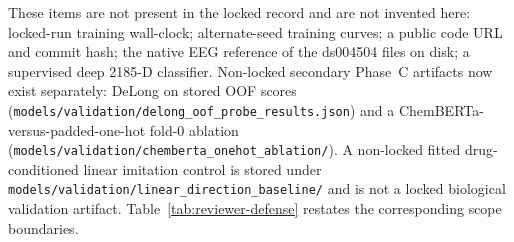 These items are not present in the locked record and are not invented here: locked-run training wall-clock; alternate-seed training curves; a public code URL and commit hash; the native EEG reference of the ds004504 files on disk; a supervised deep 2185-D classifier. Non-locked secondary Phase~C artifacts now exist separately: DeLong on stored OOF scores (\texttt{models/\allowbreak{}validation/\allowbreak{}delong\_\allowbreak{}oof\_\allowbreak{}probe\_\allowbreak{}results.\allowbreak{}json}) and a ChemBERTa-versus-padded-one-hot fold-0 ablation (\texttt{models/\allowbreak{}validation/\allowbreak{}chemberta\_\allowbreak{}onehot\_\allowbreak{}ablation/}). A non-locked fitted drug-conditioned linear imitation control is stored under \texttt{models/\allowbreak{}validation/\allowbreak{}linear\_\allowbreak{}direction\_\allowbreak{}baseline/} and is not a locked biological validation artifact. Table~\ref{tab:reviewer-defense} restates the corresponding scope boundaries.
